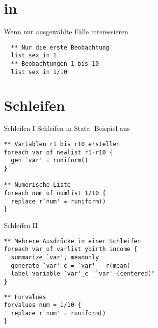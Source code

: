 \section{in}
\begin{frame}[fragile]{in}
Wenn nur ausgewählte Fälle interessieren 
\begin{lstlisting}
  ** Nur die erste Beobachtung
  list sex in 1
  ** Beobachtungen 1 bis 10
  list sex in 1/10
\end{lstlisting}

\end{frame}


\section{Schleifen}
\begin{frame}[fragile]{Schleifen I}  
Schleifen in Stata. Beispiel aus \textcite[69f.]{Kohler2012}
\begin{lstlisting}
** Variablen r1 bis r10 erstellen
foreach var of newlist r1-r10 {
  gen `var' = runiform()
}

** Numerische Liste
foreach num of numlist 1/10 {
  replace r`num' = runiform()
}
\end{lstlisting}
\end{frame}

\begin{frame}[fragile]{Schleifen II}   
\begin{lstlisting}
** Mehrere Ausdrücke in einer Schleifen
foreach var of varlist ybirth income {
  summarize `var', meanonly
  generate `var'_c = `var' - r(mean)
  label variable `var'_c "`var' (centered)"
}
\end{lstlisting}

\begin{lstlisting}
** Forvalues
forvalues num = 1/10 {
  replace r`num' = runiform()
}
\end{lstlisting}
\end{frame}

